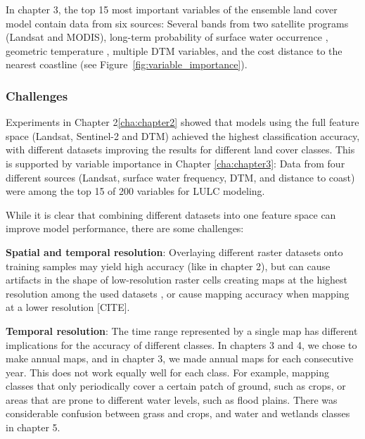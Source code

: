             In chapter 3, the top 15 most important variables of the ensemble land cover model contain data from six sources: Several bands from two satellite programs (Landsat and MODIS), long-term probability of surface water occurrence \citep{pekel2016high}, geometric temperature \citep{kilibarda2014spatio}, multiple DTM variables, and the cost distance to the nearest coastline (see Figure~\ref{fig:variable_importance}). 
    
        \subsubsection{Challenges}
            
            Experiments in Chapter 2\ref{cha:chapter2} showed that models using the full feature space (Landsat, Sentinel-2 and DTM) achieved the highest classification accuracy, with different datasets improving the results for different land cover classes. This is supported by variable importance in Chapter \ref{cha:chapter3}: Data from four different sources (Landsat, surface water frequency, DTM, and distance to coast) were among the top 15 of 200 variables for LULC modeling.
            
            While it is clear that combining different datasets into one feature space can improve model performance, there are some challenges:
    
            \textbf{Spatial and temporal resolution}: Overlaying different raster datasets onto training samples may yield high accuracy (like in chapter 2), but can cause artifacts in the shape of low-resolution raster cells creating maps at the highest resolution among the used datasets \citep{moller2019oblique}, or cause mapping accuracy when mapping at a lower resolution [CITE].
            
            \textbf{Temporal resolution}: The time range represented by a single map has different implications for the accuracy of different classes. In chapters 3 and 4, we chose to make annual maps, and in chapter 3, we made annual maps for each consecutive year. This does not work equally well for each class. For example, mapping classes that only periodically cover a certain patch of ground, such as crops, or areas that are prone to different water levels, such as flood plains. There was considerable confusion between grass and crops, and water and wetlands classes in chapter 5.

